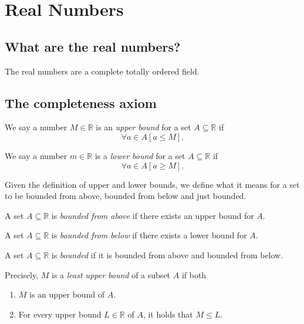 \section{Real Numbers}

\subsection{What are the real numbers?}
\begin{definition}
    The real numbers are a complete totally ordered field.
\end{definition}

\subsection{The completeness axiom}

\begin{definition}
    We say a number $M \in \mathbb{R}$ is an \emph{upper bound} for a set $A \subseteq \mathbb{R}$ if
    $$\forall a \in A [a \le M].$$

    We say a number $m \in \mathbb{R}$ is a \emph{lower bound} for a set $A \subseteq \mathbb{R}$ if
    $$\forall a \in A [a \ge M].$$
\end{definition}

Given the definition of upper and lower bounds, we define what it means
for a set to be bounded from above, bounded from below and just bounded.

\begin{definition}
    A set $A \subseteq \mathbb{R}$ is \emph{bounded from above} if there exists an upper bound for $A$.

    A set $A \subseteq \mathbb{R}$ is \emph{bounded from below} if there exists a lower bound for $A$.

    A set $A \subseteq \mathbb{R}$ is \emph{bounded} if it is bounded from above and bounded from below.
\end{definition}

\begin{definition}
    Precisely, $M$ is a \emph{least upper bound} of a subset $A$ if both
    \begin{enumerate}
        \item $M$ is an upper bound of $A$.
        \item For every upper bound $L \in \mathbb{R}$ of $A$, it holds that $M \le L$.
    \end{enumerate}
\end{definition}

